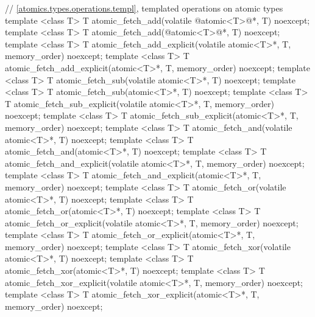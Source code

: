 \begin{codeblock}
{  // \ref{atomics.types.operations.templ}, templated operations on atomic types
  template <class T>
    T atomic_fetch_add(volatile @atomic<T>@*, T) noexcept;
  template <class T>
    T atomic_fetch_add(@atomic<T>@*, T) noexcept;
  template <class T>
    T atomic_fetch_add_explicit(volatile atomic<T>*, T, memory_order) noexcept;
  template <class T>
    T atomic_fetch_add_explicit(atomic<T>*, T, memory_order) noexcept;
  template <class T>
    T atomic_fetch_sub(volatile atomic<T>*, T) noexcept;
  template <class T>
    T atomic_fetch_sub(atomic<T>*, T) noexcept;
  template <class T>
    T atomic_fetch_sub_explicit(volatile atomic<T>*, T, memory_order) noexcept;
  template <class T>
    T atomic_fetch_sub_explicit(atomic<T>*, T, memory_order) noexcept;
  template <class T>
    T atomic_fetch_and(volatile atomic<T>*, T) noexcept;
  template <class T>
    T atomic_fetch_and(atomic<T>*, T) noexcept;
  template <class T>
    T atomic_fetch_and_explicit(volatile atomic<T>*, T, memory_order) noexcept;
  template <class T>
    T atomic_fetch_and_explicit(atomic<T>*, T, memory_order) noexcept;
  template <class T>
    T atomic_fetch_or(volatile atomic<T>*, T) noexcept;
  template <class T>
    T atomic_fetch_or(atomic<T>*, T) noexcept;
  template <class T>
    T atomic_fetch_or_explicit(volatile atomic<T>*, T, memory_order) noexcept;
  template <class T>
    T atomic_fetch_or_explicit(atomic<T>*, T, memory_order) noexcept;
  template <class T>
    T atomic_fetch_xor(volatile atomic<T>*, T) noexcept;
  template <class T>
    T atomic_fetch_xor(atomic<T>*, T) noexcept;
  template <class T>
    T atomic_fetch_xor_explicit(volatile atomic<T>*, T, memory_order) noexcept;
  template <class T>
    T atomic_fetch_xor_explicit(atomic<T>*, T, memory_order) noexcept;

}
\end{codeblock}
